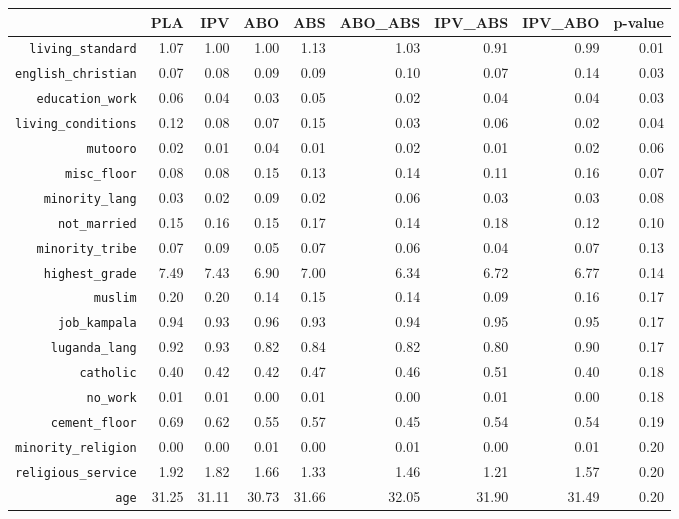 \begin{longtable}{rrrrrrrrr}
  \hline
 & PLA & IPV & ABO & ABS & ABO\_ABS & IPV\_ABS & IPV\_ABO & p-value \\ 
  \hline
{\texttt{living\_standard}} & 1.07 & 1.00 & 1.00 & 1.13 & 1.03 & 0.91 & 0.99 & 0.01 \\ 
  {\texttt{english\_christian}} & 0.07 & 0.08 & 0.09 & 0.09 & 0.10 & 0.07 & 0.14 & 0.03 \\ 
  {\texttt{education\_work}} & 0.06 & 0.04 & 0.03 & 0.05 & 0.02 & 0.04 & 0.04 & 0.03 \\ 
  {\texttt{living\_conditions}} & 0.12 & 0.08 & 0.07 & 0.15 & 0.03 & 0.06 & 0.02 & 0.04 \\ 
  {\texttt{mutooro}} & 0.02 & 0.01 & 0.04 & 0.01 & 0.02 & 0.01 & 0.02 & 0.06 \\ 
  {\texttt{misc\_floor}} & 0.08 & 0.08 & 0.15 & 0.13 & 0.14 & 0.11 & 0.16 & 0.07 \\ 
  {\texttt{minority\_lang}} & 0.03 & 0.02 & 0.09 & 0.02 & 0.06 & 0.03 & 0.03 & 0.08 \\ 
  {\texttt{not\_married}} & 0.15 & 0.16 & 0.15 & 0.17 & 0.14 & 0.18 & 0.12 & 0.10 \\ 
  {\texttt{minority\_tribe}} & 0.07 & 0.09 & 0.05 & 0.07 & 0.06 & 0.04 & 0.07 & 0.13 \\ 
  {\texttt{highest\_grade}} & 7.49 & 7.43 & 6.90 & 7.00 & 6.34 & 6.72 & 6.77 & 0.14 \\ 
  {\texttt{muslim}} & 0.20 & 0.20 & 0.14 & 0.15 & 0.14 & 0.09 & 0.16 & 0.17 \\ 
  {\texttt{job\_kampala}} & 0.94 & 0.93 & 0.96 & 0.93 & 0.94 & 0.95 & 0.95 & 0.17 \\ 
  {\texttt{luganda\_lang}} & 0.92 & 0.93 & 0.82 & 0.84 & 0.82 & 0.80 & 0.90 & 0.17 \\ 
  {\texttt{catholic}} & 0.40 & 0.42 & 0.42 & 0.47 & 0.46 & 0.51 & 0.40 & 0.18 \\ 
  {\texttt{no\_work}} & 0.01 & 0.01 & 0.00 & 0.01 & 0.00 & 0.01 & 0.00 & 0.18 \\ 
  {\texttt{cement\_floor}} & 0.69 & 0.62 & 0.55 & 0.57 & 0.45 & 0.54 & 0.54 & 0.19 \\ 
  {\texttt{minority\_religion}} & 0.00 & 0.00 & 0.01 & 0.00 & 0.01 & 0.00 & 0.01 & 0.20 \\ 
  {\texttt{religious\_service}} & 1.92 & 1.82 & 1.66 & 1.33 & 1.46 & 1.21 & 1.57 & 0.20 \\ 
  {\texttt{age}} & 31.25 & 31.11 & 30.73 & 31.66 & 32.05 & 31.90 & 31.49 & 0.20 \\ 

\end{longtable}
